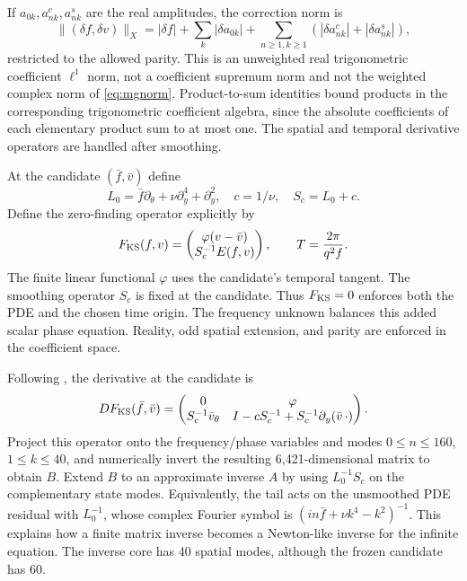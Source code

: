 \documentclass[11pt]{article}
\begin{document}
If $a_{0k},a^c_{nk},a^s_{nk}$ are the real amplitudes, the correction norm is
\begin{equation}
 \|(\delta f,\delta v)\|_X=|\delta f|
 +\sum_k|\delta a_{0k}|
 +\sum_{n\geq1,k\geq1}(|\delta a^c_{nk}|+|\delta a^s_{nk}|),
 \label{eq:ksnorm}
\end{equation}
restricted to the allowed parity. This is an unweighted real trigonometric coefficient $\ell^1$ norm, not a coefficient supremum norm and not the weighted complex norm of \eqref{eq:mgnorm}. Product-to-sum identities bound products in the corresponding trigonometric coefficient algebra, since the absolute coefficients of each elementary product sum to at most one. The spatial and temporal derivative operators are handled after smoothing.

At the candidate $(\bar f,\bar v)$ define
\begin{equation}
 L_0=\bar f\partial_\theta+\nu\partial_y^4+\partial_y^2,
 \quad c=1/\nu,\quad S_c=L_0+c.
\end{equation}
Define the zero-finding operator explicitly by
\begin{equation}
 F_{\rm KS}(f,v)=\begin{pmatrix}
 \varphi(v-\bar v)\\ S_c^{-1}E(f,v)
 \end{pmatrix},
 \qquad T=\frac{2\pi}{q^2f}.
 \label{eq:kszero}
\end{equation}
The finite linear functional $\varphi$ uses the candidate's temporal tangent.
The smoothing operator $S_c$ is fixed at the candidate. Thus
$F_{\rm KS}=0$ enforces both the PDE and the chosen time origin. The frequency
unknown balances this added scalar phase equation. Reality, odd spatial
extension, and parity are enforced in the coefficient space.

Following \citet{figueras2017}, the derivative at the candidate is
\begin{equation}
 DF_{\rm KS}(\bar f,\bar v)=
 \begin{pmatrix}
 0&\varphi\\
 S_c^{-1}\bar v_\theta&I-cS_c^{-1}+S_c^{-1}\partial_y(\bar v\,\cdot)
 \end{pmatrix}.
 \label{eq:kslinearization}
\end{equation}
Project this operator onto the frequency/phase variables and modes
$0\leq n\leq160$, $1\leq k\leq40$, and numerically invert the resulting
6,421-dimensional matrix to obtain $B$. Extend $B$ to an approximate inverse
$A$ by using $L_0^{-1}S_c$ on the complementary state modes. Equivalently,
the tail acts on the unsmoothed PDE residual with $L_0^{-1}$, whose complex
Fourier symbol is $(in\bar f+\nu k^4-k^2)^{-1}$. This explains how a finite
matrix inverse becomes a Newton-like inverse for the infinite equation.
The inverse core has 40 spatial modes, although the frozen candidate has 60.
\end{document}
